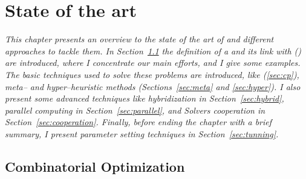\chapter{State of the art}
\label{chap:art}
\textit{This chapter presents an overview to the state of the art of \COPs{} and different approaches to tackle them. In Section~\ref{sec:combi} the definition of a \COP{} and its link with \CSPs{} (\csp) are introduced, where I concentrate our main efforts, and I give some examples. The basic techniques used to solve these problems are introduced, like {\it \cp} (\ref{sec:cp}), {\it meta-- and hyper--heuristic methods} (Sections~\ref{sec:meta} and \ref{sec:hyper}). I also present some advanced techniques like {\it hybridization} in Section~\ref{sec:hybrid}, {\it parallel computing} in Section~\ref{sec:parallel}, and {\it Solvers cooperation} in Section~\ref{sec:cooperation}. Finally, before ending the chapter with a brief summary,  I present {\it parameter setting techniques} in Section~\ref{sec:tunning}.}
\vfill
\minitoc
\newpage



\section{Combinatorial Optimization}
\label{sec:combi}

